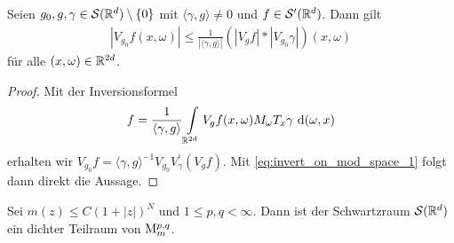 \begin{lem}\label{th:estimate_convolution_pointswise_modulation}
	Seien $ g_0, g , \gamma \in \mathcal{S}(\mathbb{R}^d) \setminus \{ 0\} $ mit $ \langle \gamma , g \rangle \neq 0 $ und $ f \in \mathcal{S}^\prime(\mathbb{R}^d) $. Dann gilt
	\begin{align}\label{eq:estimate_convolution_pointswise_modulation}
	| V_{g_0 } f(x,\omega)|
	\leq
	\frac{1}{|\langle \gamma , g \rangle |}
	(|V_g f| \ast |V_{g_0} \gamma |)(x,\omega)
	\end{align}
	für alle $ (x,\omega) \in \mathbb{R}^{2d} $.
\end{lem}

\begin{proof}
	Mit der Inversionsformel
	\begin{align*}
	f = \frac{1}{\langle \gamma , g  \rangle}
	\int \limits_{\mathbb{R}^{2d}} V_g f(x,\omega ) M_\omega T_x  \gamma \text{ d} (\omega,x)
	\end{align*}
	erhalten wir $V_{g_0 } f = \langle \gamma , g \rangle^{-1}V_{g_0} V^\prime_\gamma(V_g f) $.
	Mit \eqref{eq:invert_on_mod_space_1} folgt dann direkt die Aussage.
\end{proof}

\begin{sz}\label{th:density_schwartzspace}
	Sei $ m(z) \leq C (1+ |z|)^N $ und $ 1 \leq p,q < \infty $.
	Dann ist der Schwartzraum $ \mathcal{S}(\mathbb{R}^d)  $ ein dichter Teilraum von $ \mathrm{M}_m^{p,q} $.
\end{sz}

